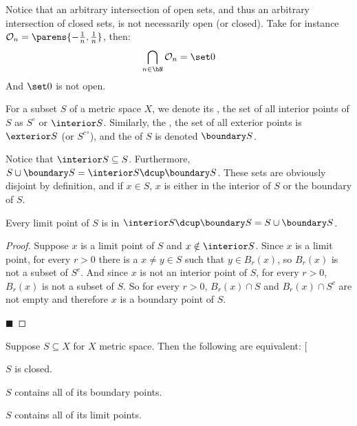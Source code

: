 \documentclass[10pt]{article}
\makeatletter
\def\@blist[#1]{%
    \bgroup\bgroup\par\vskip-\medskipamount%
    \gdef\item{%
        \par\egroup\bgroup\medskip\setbox0=\hbox{#1\quad}%
        \advance\leftskip by \wd0\leavevmode\kern-\wd0\box0%
    }%
}
\def\blist{\@ifnextchar[ \@blist {\@blist[$\bullet$]}}
\def\elist{\par\egroup\egroup\medskip}
\def\openset{{\cal O}}
\makeatother
\begin{document}
Notice that an arbitrary intersection of open sets, and thus an arbitrary intersection of closed sets, is not necessarily open (or closed).
Take for instance $\openset_n=\parens{-\frac1n,\frac1n}$, then:
\[ \bigcap_{n\in\bN}\openset_n = \set0 \]
And $\set0$ is not open.

\begin{defn*}

    For a subset $S$ of a metric space $X$, we denote its , the set of all interior points of $S$ as $S^\circ$ or $\interior S$.
    Similarly, the , the set of all exterior points is $\exterior S$ (or ${S^c}^\circ$), and the  of $S$ is denoted $\boundary S$.

\end{defn*}

Notice that $\interior S\subseteq S$.
Furthermore, $S\cup\boundary S=\interior S\dcup \boundary S$.
These sets are obviously disjoint by definition, and if $x\in S$, $x$ is either in the interior of $S$ or the boundary of $S$.

\begin{lemm*}

    Every limit point of $S$ is in $\interior S\dcup\boundary S = S\cup\boundary S$.

\end{lemm*}

\begin{proof}

    Suppose $x$ is a limit point of $S$ and $x\notin\interior S$.
    Since $x$ is a limit point, for every $r>0$ there is a $x\neq y\in S$ such that $y\in B_r(x)$, so $B_r(x)$ is not a subset of $S^c$.
    And since $x$ is not an interior point of $S$, for every $r>0$, $B_r(x)$ is not a subset of $S$.
    So for every $r>0$, $B_r(x)\cap S$ and $B_r(x)\cap S^c$ are not empty and therefore $x$ is a boundary point of $S$.

    \hfill$\blacksquare$

\end{proof}

\begin{thrm*}

    Suppose $S\subseteq X$ for $X$ metric space.
    Then the following are equivalent:
    \blist
        \item $S$ is closed.
        \item $S$ contains all of its boundary points.
        \item $S$ contains all of its limit points.
    \elist

\end{thrm*}
\end{document}
